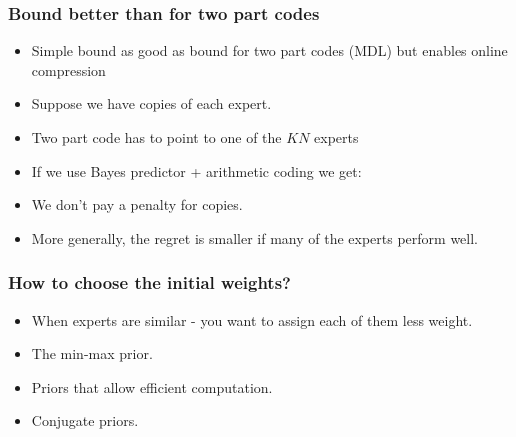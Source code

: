 \documentclass{beamer}
\begin{document}

\begin{frame}
\frametitle{Bound better than for two part codes}
\begin{itemize}
\item
Simple bound as good as bound for two part codes (MDL) 
but enables online compression
\item Suppose we have  copies of each expert.
\item Two part code has to point to one of the $KN$ experts
\item If we use Bayes predictor + arithmetic coding we get:
\item We don't pay a penalty for copies.
\item More generally, the regret is smaller if many of the experts perform well.
\end{itemize}
\end{frame}

\begin{frame}
\frametitle{How to choose the initial weights?}
\begin{itemize}
\item When experts are similar - you want to assign each of them less
  weight.
\item The min-max prior.
\item Priors that allow efficient computation.
\item Conjugate priors.
\end{itemize}
\end{frame}
\end{document}
